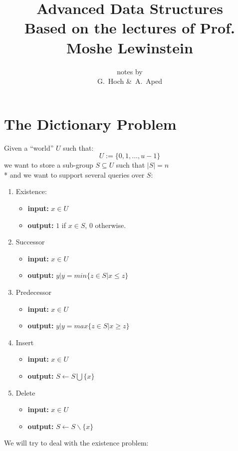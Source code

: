 \documentclass[11pt]{book}
\author{notes by\\ G.~Hoch \&~A.~Aped}
\title{\Huge \textbf{Advanced Data Structures}\\ 
\LARGE Based on the lectures of Prof. Moshe Lewinstein}
\begin{document}
\maketitle
\tableofcontents
\newpage

\chapter{The Dictionary Problem}
Given a ``world'' $U$ such that:
\[U:=\{0,1,\ldots{},u-1\}\]
we want to store a sub-group $S\subseteq U$ such that $|S|=n$ \\*
and we want to support several queries over $S$:
\flushleft
\begin{enumerate}
\item Existence:
\begin{itemize}
\item \textbf{input:} $x\in U$
\item \textbf{output:} $1$ if $x\in S$, $0$ otherwise.
\end{itemize}
\item Successor
\begin{itemize}
\item \textbf{input:} $x\in U$
\item \textbf{output:} $y|y=min\{z\in S|x\le z\}$
\end{itemize}
\item Predecessor
\begin{itemize}
\item \textbf{input:} $x\in U$
\item \textbf{output:} $y|y=max\{z\in S|x\ge z\}$
\end{itemize}
\item Insert
\begin{itemize}
\item \textbf{input:} $x\in U$
\item \textbf{output:} $S\gets S\bigcup \{x\}$
\end{itemize}
\item Delete
\begin{itemize}
\item \textbf{input:} $x\in U$
\item \textbf{output:} $S\gets S \backslash \{x\}$
\end{itemize}
\end{enumerate}
\newpage

We will try to deal with the existence problem:
\end{document}
